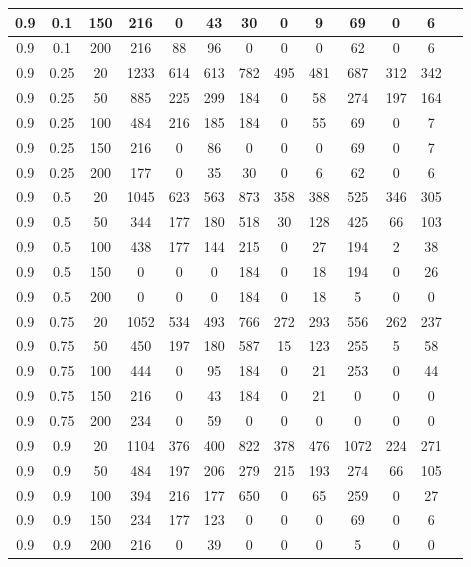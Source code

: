 \begin{table}[H]
\begin{tabular}{|c|c|c|c|c|c|c|c|c|c|c|c|c|}
0.9 & 0.1 & 150 & 216 & 0 & 43 & 30 & 0 & 9 & 69 & 0 & 6 \\ \hline
0.9 & 0.1 & 200 & 216 & 88 & 96 & 0 & 0 & 0 & 62 & 0 & 6 \\ \hline
0.9 & 0.25 & 20 & 1233 & 614 & 613 & 782 & 495 & 481 & 687 & 312 & 342 \\ \hline
0.9 & 0.25 & 50 & 885 & 225 & 299 & 184 & 0 & 58 & 274 & 197 & 164 \\ \hline
0.9 & 0.25 & 100 & 484 & 216 & 185 & 184 & 0 & 55 & 69 & 0 & 7 \\ \hline
0.9 & 0.25 & 150 & 216 & 0 & 86 & 0 & 0 & 0 & 69 & 0 & 7 \\ \hline
0.9 & 0.25 & 200 & 177 & 0 & 35 & 30 & 0 & 6 & 62 & 0 & 6 \\ \hline
0.9 & 0.5 & 20 & 1045 & 623 & 563 & 873 & 358 & 388 & 525 & 346 & 305 \\ \hline
0.9 & 0.5 & 50 & 344 & 177 & 180 & 518 & 30 & 128 & 425 & 66 & 103 \\ \hline
0.9 & 0.5 & 100 & 438 & 177 & 144 & 215 & 0 & 27 & 194 & 2 & 38 \\ \hline
0.9 & 0.5 & 150 & 0 & 0 & 0 & 184 & 0 & 18 & 194 & 0 & 26 \\ \hline
0.9 & 0.5 & 200 & 0 & 0 & 0 & 184 & 0 & 18 & 5 & 0 & 0 \\ \hline
0.9 & 0.75 & 20 & 1052 & 534 & 493 & 766 & 272 & 293 & 556 & 262 & 237 \\ \hline
0.9 & 0.75 & 50 & 450 & 197 & 180 & 587 & 15 & 123 & 255 & 5 & 58 \\ \hline
0.9 & 0.75 & 100 & 444 & 0 & 95 & 184 & 0 & 21 & 253 & 0 & 44 \\ \hline
0.9 & 0.75 & 150 & 216 & 0 & 43 & 184 & 0 & 21 & 0 & 0 & 0 \\ \hline
0.9 & 0.75 & 200 & 234 & 0 & 59 & 0 & 0 & 0 & 0 & 0 & 0 \\ \hline
0.9 & 0.9 & 20 & 1104 & 376 & 400 & 822 & 378 & 476 & 1072 & 224 & 271 \\ \hline
0.9 & 0.9 & 50 & 484 & 197 & 206 & 279 & 215 & 193 & 274 & 66 & 105 \\ \hline
0.9 & 0.9 & 100 & 394 & 216 & 177 & 650 & 0 & 65 & 259 & 0 & 27 \\ \hline
0.9 & 0.9 & 150 & 234 & 177 & 123 & 0 & 0 & 0 & 69 & 0 & 6 \\ \hline
0.9 & 0.9 & 200 & 216 & 0 & 39 & 0 & 0 & 0 & 5 & 0 & 0 \\ \hline
\end{tabular}
\label{tab:experiment_results}
\end{table}